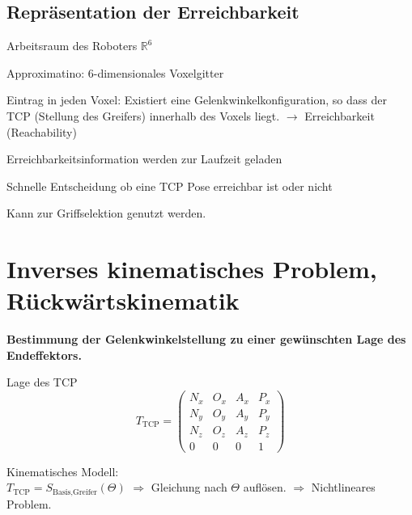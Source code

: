 \subsection{Repräsentation der Erreichbarkeit}
\begin{compactitem}
    \item Arbeitsraum des Roboters $\mathbb{R}^6$
    \item Approximatino: 6-dimensionales Voxelgitter
    \item Eintrag in jeden Voxel: Existiert eine Gelenkwinkelkonfiguration, so dass der TCP (Stellung
    des Greifers) innerhalb des Voxels liegt. $\rightarrow$ Erreichbarkeit (Reachability)
\end{compactitem}
\begin{compactitem}
    \item Erreichbarkeitsinformation werden zur Laufzeit geladen
    \item Schnelle Entscheidung ob eine TCP Pose erreichbar ist oder nicht
    \item Kann zur Griffselektion genutzt werden.
\end{compactitem}


\section{Inverses kinematisches Problem, Rückwärtskinematik}
\textbf{Bestimmung der Gelenkwinkelstellung zu einer gewünschten Lage des Endeffektors.}

Lage des TCP
\begin{displaymath}
     T_{\text{TCP}} = \begin{pmatrix} N_x&O_x&A_x&P_x \\ N_y&O_y&A_y&P_y \\
     N_z&O_z&A_z&P_z \\ 0&0&0&1\end{pmatrix}
\end{displaymath}

Kinematisches Modell:\\
$T_{\text{TCP}} = S_\text{Basis,Greifer}(\Theta)$
$\Rightarrow$ Gleichung nach $\Theta$ auflösen.
$\Rightarrow$ Nichtlineares Problem.

